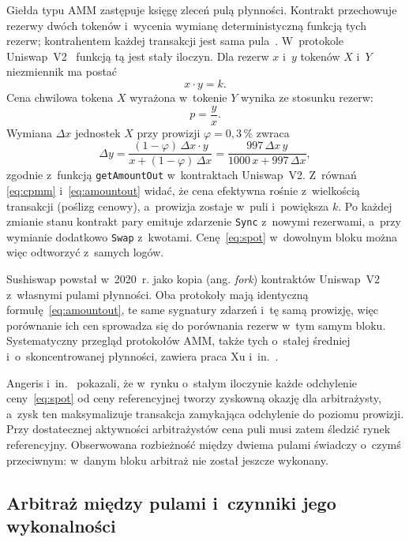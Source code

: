 Giełda typu AMM zastępuje księgę zleceń pulą płynności. Kontrakt przechowuje rezerwy dwóch
tokenów i~wycenia wymianę deterministyczną funkcją tych rezerw; kontrahentem każdej transakcji
jest sama pula~\cite{xu_sok_amm}. W~protokole Uniswap~V2~\cite{uniswap_v2} funkcją tą jest stały
iloczyn. Dla rezerw $x$ i~$y$ tokenów $X$ i~$Y$ niezmiennik ma postać
\begin{equation}
  x \cdot y = k .
  \label{eq:cpmm}
\end{equation}
Cena chwilowa tokena $X$ wyrażona w~tokenie $Y$ wynika ze stosunku rezerw:
\begin{equation}
  p = \frac{y}{x}.
  \label{eq:spot}
\end{equation}
Wymiana $\Delta x$ jednostek $X$ przy prowizji $\varphi = 0{,}3\,\%$ zwraca
\begin{equation}
  \Delta y = \frac{(1-\varphi)\,\Delta x \cdot y}{x + (1-\varphi)\,\Delta x}
           = \frac{997\,\Delta x\, y}{1000\,x + 997\,\Delta x},
  \label{eq:amountout}
\end{equation}
zgodnie z~funkcją \texttt{getAmountOut} w~kontraktach Uniswap~V2. Z~równań \eqref{eq:cpmm} i~\eqref{eq:amountout} widać, że cena efektywna rośnie z~wielkością transakcji (poślizg cenowy),
a~prowizja zostaje w~puli i~powiększa $k$. Po każdej zmianie stanu kontrakt pary emituje
zdarzenie \texttt{Sync} z~nowymi rezerwami, a~przy wymianie dodatkowo \texttt{Swap} z~kwotami.
Cenę~\eqref{eq:spot} w~dowolnym bloku można więc odtworzyć z~samych logów.

Sushiswap powstał w~2020~r. jako kopia (ang. \emph{fork}) kontraktów Uniswap~V2 z~własnymi pulami
płynności. Oba protokoły mają identyczną formułę~\eqref{eq:amountout}, te same sygnatury zdarzeń
i~tę samą prowizję, więc porównanie ich cen sprowadza się do porównania rezerw w~tym samym
bloku. Systematyczny przegląd protokołów AMM, także tych o~stałej średniej i~o~skoncentrowanej
płynności, zawiera praca Xu i~in.~\cite{xu_sok_amm}.

Angeris i~in.~\cite{angeris_uniswap} pokazali, że w~rynku o~stałym iloczynie każde odchylenie
ceny~\eqref{eq:spot} od ceny referencyjnej tworzy zyskowną okazję dla arbitrażysty, a~zysk ten
maksymalizuje transakcja zamykająca odchylenie do poziomu prowizji. Przy dostatecznej
aktywności arbitrażystów cena puli musi zatem śledzić rynek referencyjny. Obserwowana
rozbieżność między dwiema pulami świadczy o~czymś przeciwnym: w~danym bloku arbitraż nie został
jeszcze wykonany.

\subsection{Arbitraż między pulami i~czynniki jego wykonalności}

